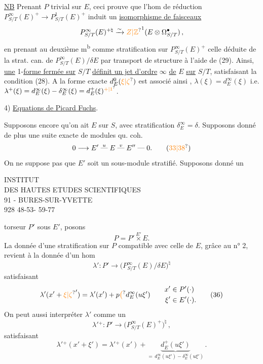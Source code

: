 \uline{NB} Prenant $P$ trivial sur $E$, ceci prouve que l'hom  de réduction $P^\infty_{S/T}(E)^+\longrightarrow P^1_{S/T}(E)^+$ induit un  \uline{isomorphisme de faisceaux}
\[
 P^\infty_{S/T}(E)^{+\natural}\xrightarrow{\sim}{\unsure{Z|\mathbb Z}}^{1}(E\otimes\Omega^\bullet_{S/T})\,,
\]
en prenant au deuxième m\textsuperscript{b} comme stratification sur $P^\infty_{S/T}(E)^+$ celle déduite de la strat. can. de $P^\infty_{S/T}(E)/\delta E$ par transport de structure à l'aide de (29). Ainsi, \uline{une} 1-\uline{forme fermée sur} $S/T$  \uline{définit un jet d'ordre} $\infty$ \inserted{$\lambda^+$} \uline{de} $E$ \uline{sur} $S/T$, satisfaisant la condition (28). A la forme exacte $d^0_E(\unsure{\xi|\zeta})$ est associé ainsi  \deleted{\unsure{$\lambda^+(\xi)$}}, $\lambda(\xi)=d^\infty_E(\xi)$ i.e. $\lambda^+(\xi)=d^\infty_E(\xi)-\delta^\infty_E(\xi)=d^+_E(\xi)^{\unsure{+|1}}$.

4) \uline{Equations de Picard Fuchs}.

Supposons encore qu'on ait $E$ sur $S$, avec stratification $\delta^\infty_E=\delta$. Supposons donné de plus une suite exacte de modules qu. coh.
\[
 0\longrightarrow E'\mathrel{\overset{u}{\text{---}}}E\mathrel{\overset{v}{\text{---}}}E''\mathrel{\text{---}}0 . \tag*{(\unsure{33|38})}
\]
On ne suppose pas que $E'$ soit un sous-module stratifié.  Supposons donné un
\begin{center}
INSTITUT\\
DES HAUTES ETUDES SCIENTIFIQUES\\
91 - BURES-SUR-YVETTE\\
928 48-53\quad - 59-77
\end{center}
torseur $P'$ sous $E'$, posons
\[
 P=P'\mathbin{\overset{E'}{\times}}E . \tag*{(34)}
\]
La donnée d'une stratification sur $P$ compatible avec celle de $E$, grâce au n° 2, revient à la donnée d'un hom
\[
 \lambda':P'\longrightarrow \bigl(P^\infty_{S/T}(E)/\delta E\bigr)^\natural \tag*{(35)}
\]
satisfaisant
\[
 \lambda'(x'+{\unsure{\xi|\zeta}}')=\lambda'(x')+p\unsure{\bigl(}d^\infty_E(u\xi')\qquad
 \begin{aligned}x'&\in P'(\cdot)\\ \xi'&\in E'(\cdot).\end{aligned} \tag*{(36)}
\]
On peut aussi interpréter $\lambda'$ comme un
\[
 \lambda'{}^+:P'\longrightarrow\bigl(P^\infty_{S/T}(E)^+\bigr)^\natural \,, \tag*{(35$'$)}
\]
satisfaisant
\[
 \lambda'{}^+(x'+\xi')=\lambda'{}^+(x')+
 \underbrace{d^+_E(u\xi')}_{=\,d^\infty_E(u\xi')-\delta^\infty_E(u\xi')}\,. \tag*{(36)$'$}
\]

